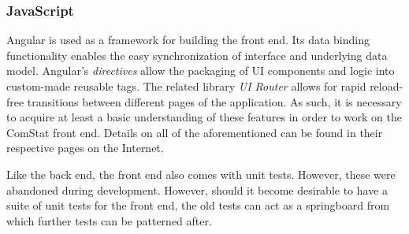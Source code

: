 \subsubsection{JavaScript} 

Angular is used as a framework for building the front end. Its data binding functionality enables the easy synchronization of interface and underlying data model. Angular's \emph{directives} allow the packaging of UI components and logic into custom-made reusable tags. The related library \emph{UI Router} allows for rapid reload-free transitions between different pages of the application. As such, it is necessary to acquire at least a basic understanding of these features in order to work on the ComStat front end. Details on all of the aforementioned can be found in their respective pages on the Internet.

Like the back end, the front end also comes with unit tests. However, these were abandoned during development. However, should it become desirable to have a suite of unit tests for the front end, the old tests can act as a springboard from which further tests can be patterned after.




\clearpage
